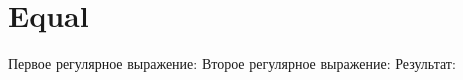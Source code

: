 \section{Equal}
\begin{frame}{}
	Первое регулярное выражение:
Второе регулярное выражение:
	Результат:
\end{frame}
